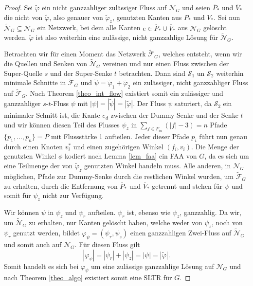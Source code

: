 \begin{proof}
Sei $\tilde{\varphi}$ ein nicht ganzzahliger zulässiger Fluss auf $\mathcal{N}_G$ und seien $\overline{P}_*$ und $\overline{V}_*$ die nicht von $\tilde{\varphi}$, also genauer von $\tilde{\varphi}_z$, genutzten Kanten aus $P_*$ und $V_*$. Sei nun $\tilde{\mathcal{N}}_G \subseteq \mathcal{N}_G$ ein Netzwerk, bei dem alle Kanten $e \in \overline{P}_*\cup\overline{V}_*$ aus $\mathcal{N}_G$ gelöscht werden. $\tilde{\varphi}$ ist also weiterhin eine zulässige, nicht ganzzahlige Lösung für $\tilde{\mathcal{N}}_G$.

Betrachten wir für einen Moment das Netzwerk $\tilde{\mathcal{F}}_G$, welches entsteht, wenn wir die Quellen und Senken von $\tilde{\mathcal{N}}_G$ vereinen und nur einen Fluss zwischen der Super-Quelle $s$ und der Super-Senke $t$ betrachten. Dann sind $\mathcal{S}_1$ un $\mathcal{S}_2$ weiterhin minimale Schnitte in $\tilde{\mathcal{F}}_G$ und $\tilde{\psi} = \tilde{\varphi}_1+ \tilde{\varphi}_2$ ein zulässiger, nicht ganzzahliger Fluss auf $\tilde{\mathcal{F}}_G$. Nach Theorem \ref{theo_int_flow} existiert somit ein zulässiger und ganzzahliger $s$-$t$-Fluss $\psi$ mit $|\psi| = |\tilde{\psi}| = |\tilde{\varphi}|.$ Der Fluss $\psi$ saturiert, da $\mathcal{S}_2$ ein minimaler Schnitt ist, die Kante $e_d$ zwischen der Dummy-Senke und der Senke $t$ und wir können diesen Teil des Flusses $\psi_z$ in $\sum_{f \in F_{in}}(|f|-3)=n$ Pfade $\{p_1, ... ,p_n\} = P$ mit Flussstärke 1 aufteilen. Jeder dieser Pfade $p_i$ führt nun genau durch einen Knoten $v_i^*$ und einen zugehörigen Winkel $(f_i,v_i)$. Die Menge der genutzten Winkel $\phi$ kodiert nach Lemma \ref{lem_faa} ein FAA von $G$, da es sich um eine Teilmenge der von $\tilde{\varphi}_z$ genutzten Winkel handeln muss. Alle anderen, in $\mathcal{N}_G$ möglichen, Pfade zur Dummy-Senke durch die restlichen Winkel wurden, um $\tilde{\mathcal{F}}_G$ zu erhalten, durch die Entfernung von $\overline{P}_*$ und $\overline{V}_*$ getrennt und stehen für $\psi$ und somit für $\psi_z$ nicht zur Verfügung.

Wir können $\psi$ in $\psi_z$ und $\psi_r$ aufteilen. $\psi_r$ ist, ebenso wie $\psi_z$, ganzzahlig. Da wir, um $\tilde{\mathcal{N}}_G$ zu erhalten, nur Kanten gelöscht haben, welche weder von $\psi_z$, noch von $\psi_r$ genutzt werden, bildet $\varphi_\psi = (\psi_r,\psi_z)$ einen ganzzahligen Zwei-Fluss auf $\tilde{\mathcal{N}}_G$ und somit auch auf $\mathcal{N}_G$. Für diesen Fluss gilt
$$ |\varphi_\psi| = |\psi_r|+|\psi_z| = |\psi| = |\tilde{\varphi}|. $$
Somit handelt es sich bei $\varphi_\psi$ um eine zulässige ganzzahlige Lösung auf $\mathcal{N}_G$ und nach Theorem \ref{theo_algo} existiert somit eine SLTR für $G$.
\end{proof}

